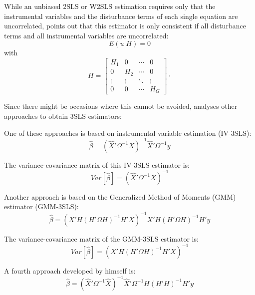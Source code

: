 While an unbiased 2SLS or W2SLS estimation requires only that 
the instrumental variables and the disturbance terms of each single 
equation are uncorrelated,
\cite{schmidt90} points out that this estimator is only consistent 
if all disturbance terms and all instrumental variables are uncorrelated:
\begin{equation}
   E \left( u | H \right) = 0
\end{equation}
with
\begin{equation}
   H =
   \left[ \begin{array}{cccc}
      H_1 & 0 & \cdots & 0\\
      0 & H_2 & \cdots & 0\\
      \vdots & \vdots & \ddots & \vdots\\
      0 & 0 & \cdots & H_G
   \end{array}\right] \cdot 
\end{equation}

Since there might be occasions where this cannot be avoided, 
\cite{schmidt90} analyses other approaches to obtain 3SLS estimators:

One of these approaches is based on instrumental variable estimation
(IV-3SLS):
\begin{equation}
   \widehat{\beta} = \left( \widehat{X}' \Omega^{-1} X 
   \right)^{-1} \widehat{X}' \Omega^{-1} y
\end{equation}

The variance-covariance matrix of this IV-3SLS estimator is:
\begin{equation}
   Var \left[ \widehat{\beta} \right] = \left( \widehat{X}' \Omega^{-1} 
   X \right)^{-1}
\end{equation}


Another approach is based on the Generalized Method of Moments (GMM) 
estimator (GMM-3SLS):
\begin{equation}
   \widehat{\beta} = \left( X' H \left( H' \Omega H \right)^{-1}
   H' X \right)^{-1} X' H \left( H' \Omega H \right)^{-1} H' y
   \label{eq:beta3slsGMM}
\end{equation}

The variance-covariance matrix of the GMM-3SLS estimator is:
\begin{equation}
   Var \left[ \widehat{\beta} \right] = 
   \left( X' H \left( H' \Omega H \right)^{-1} H' X \right)^{-1}
\end{equation}


A fourth approach developed by \cite{schmidt90} himself is:
\begin{equation}
   \widehat{\beta} = \left( \widehat{X}' \Omega^{-1} \widehat{X} 
   \right)^{-1} \widehat{X}' \Omega^{-1} 
   H \left( H' H \right)^{-1} H' y 
   \label{eq:beta3slsSchmidt}
\end{equation}

